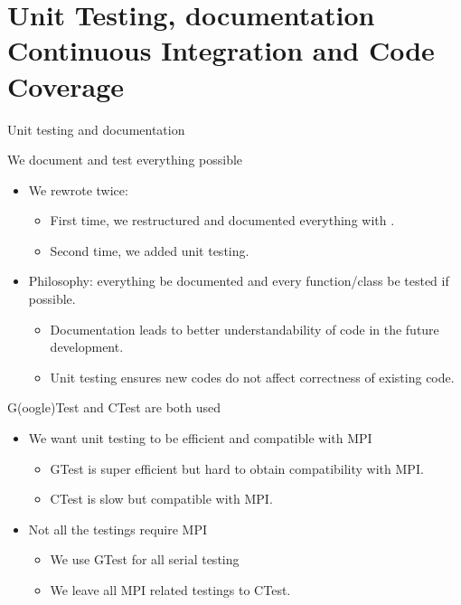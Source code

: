 \section[Testing]{Unit Testing, documentation Continuous Integration and Code Coverage}
\begin{frame}{Unit testing and documentation}
	\begin{block}{We document and test everything possible}
		\begin{itemize}
			\item We rewrote  twice:
			\begin{itemize}
					\item First time, we restructured  and documented everything with .
					\item Second time, we added unit testing.
			\end{itemize}
			\item Philosophy: everything be documented and every function/class be tested if possible.
			\begin{itemize}
				\item Documentation leads to better understandability of code in the future development.
				\item Unit testing ensures new codes do not affect correctness of existing code.
			\end{itemize}
		\end{itemize}
	\end{block}
	
	\begin{block}{G(oogle)Test and CTest are both used}
		\begin{itemize}
			\item We want unit testing to be efficient and compatible with MPI
			\begin{itemize}
				\item GTest is super efficient but hard to obtain compatibility with MPI.
				\item CTest is slow but compatible with MPI.
			\end{itemize}
			\item Not all the testings require MPI
			\begin{itemize}
				\item We use GTest for all serial testing
				\item We leave all MPI related testings to CTest.
			\end{itemize}
		\end{itemize}
	\end{block}
\end{frame}
